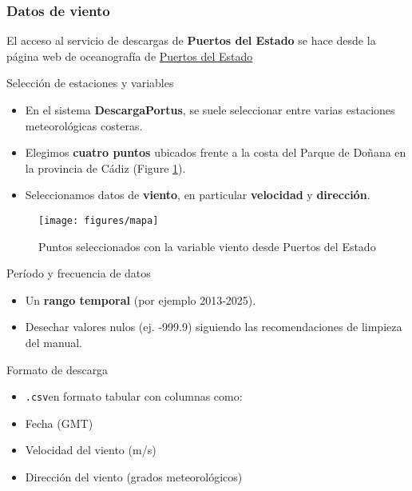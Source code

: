 \documentclass[
]{article}
\providecommand{\tightlist}{%
  \setlength{\itemsep}{0pt}\setlength{\parskip}{0pt}}
\begin{document}
\subsubsection{Datos de viento}\label{datos-de-viento}

El acceso al servicio de descargas de \textbf{Puertos del Estado} se hace desde la página web de oceanografía de \href{http://www.puertos.es/es-es/oceanografia/Paginas/portus.aspx}{Puertos del Estado}

Selección de estaciones y variables

\begin{itemize}
\tightlist
\item
  En el sistema \textbf{DescargaPortus}, se suele seleccionar entre varias estaciones meteorológicas costeras.
\item
  Elegimos \textbf{cuatro puntos} ubicados frente a la costa del Parque de Doñana en la provincia de Cádiz (Figure \ref{fig:mapa}).
\item
  Seleccionamos datos de \textbf{viento}, en particular \textbf{velocidad} y \textbf{dirección}.
\end{itemize}

\begin{figure}

{\centering \texttt{[image: figures/mapa]} 

}

\caption{Puntos seleccionados con la variable viento desde Puertos del Estado}\label{fig:mapa}
\end{figure}

Período y frecuencia de datos

\begin{itemize}
\tightlist
\item
  Un \textbf{rango temporal} (por ejemplo 2013‑2025).
\item
  Desechar valores nulos (ej. ‑999.9) siguiendo las recomendaciones de limpieza del manual.
\end{itemize}

Formato de descarga

\begin{itemize}
\tightlist
\item
  \texttt{.csv}en formato tabular con columnas como:
\item
  Fecha (GMT)
\item
  Velocidad del viento (m/s)
\item
  Dirección del viento (grados meteorológicos)
\end{itemize}
\end{document}
